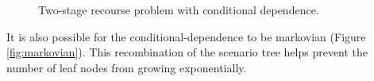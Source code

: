 \documentclass[final,1p,times]{elsarticle}
\newcommand{\drawHDsquiggle}[1]{\draw[-stealth, decoration={snake, amplitude = .4mm, segment length = 1.5mm, post length=0.9mm},decorate] (#1)+(-0.75, 0.5) -- (#1);}
\begin{document}


\begin{figure}[!ht]
    \centering
{}
\caption{Two-stage recourse problem with conditional dependence.}
\label{fig:conditional}
\end{figure}

It is also possible for the conditional-dependence to be markovian (Figure \ref{fig:markovian}). This recombination of the scenario tree helps prevent the number of leaf nodes from growing exponentially.
\end{document}
